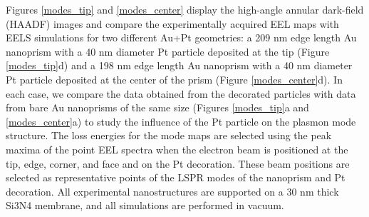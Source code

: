 \documentclass [11pt, proquest] {uwthesis}[2016/11/22]
\begin{document}
Figures \ref{modes_tip} and \ref{modes_center} display the high-angle annular dark-field (HAADF) images and compare the experimentally acquired EEL maps with EELS simulations for two different Au+Pt geometries: a 209 nm edge length Au nanoprism with a 40 nm diameter Pt particle deposited at the tip (Figure \ref{modes_tip}d) and a 198 nm edge length Au nanoprism with a 40 nm diameter Pt particle deposited at the center of the prism (Figure \ref{modes_center}d). In each case, we compare the data obtained from the decorated particles with data from bare Au nanoprisms of the same size (Figures \ref{modes_tip}a and \ref{modes_center}a) to study the influence of the Pt particle on the plasmon mode structure. The loss energies for the mode maps are selected using the peak maxima of the point EEL spectra when the electron beam is positioned at the tip, edge, corner, and face and on the Pt decoration. These beam positions are selected as representative points of the LSPR modes of the nanoprism and Pt decoration. All experimental nanostructures are supported on a 30 nm thick Si3N4 membrane, and all simulations are performed in vacuum.
\end{document}
